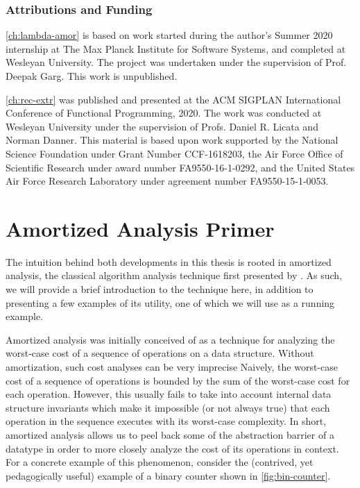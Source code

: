 \subsubsection{Attributions and Funding}

\autoref{ch:lambda-amor} is based on work started during the author's Summer 2020 internship at The Max Planck Institute for Software Systems, and completed at Wesleyan University. The project was undertaken under the supervision of Prof. Deepak Garg. This work is unpublished.

\autoref{ch:rec-extr} was published and presented at the ACM SIGPLAN International Conference of Functional Programming, 2020. The work was conducted at Wesleyan University under the supervision of Profs. Daniel R. Licata and Norman Danner. This material is based upon work supported by the National Science Foundation under Grant Number CCF-1618203, the Air Force Office of Scientific Research under award number FA9550-16-1-0292, and the United States Air Force Research Laboratory under agreement number FA9550-15-1-0053.


\section{Amortized Analysis Primer}
\label{sec:amortized-primer}
The intuition behind both developments in this thesis is rooted in amortized analysis, the classical algorithm analysis technique first presented by \citet{tarjan:amortized-complexity}. As such, we will provide a brief introduction to the technique here, in addition to presenting a few examples of its utility, one of which we will use as a running example.

Amortized analysis was initially conceived of as a technique for analyzing the worst-case cost of a sequence of operations on a data structure. Without amortization, such cost analyses can be very imprecise Naively, the worst-case cost of a sequence of operations is bounded by the sum of the worst-case cost for each operation. However, this usually fails to take into account internal data structure invariants which make it impossible (or not always true) that each operation in the sequence executes with its worst-case complexity. In short, amortized analysis allows us to peel back some of the abstraction barrier of a datatype in order to more closely analyze the cost of its operations in context. For a concrete example of this phenomenon, consider the (contrived, yet pedagogically useful) example of a binary counter shown in \autoref{fig:bin-counter}.

